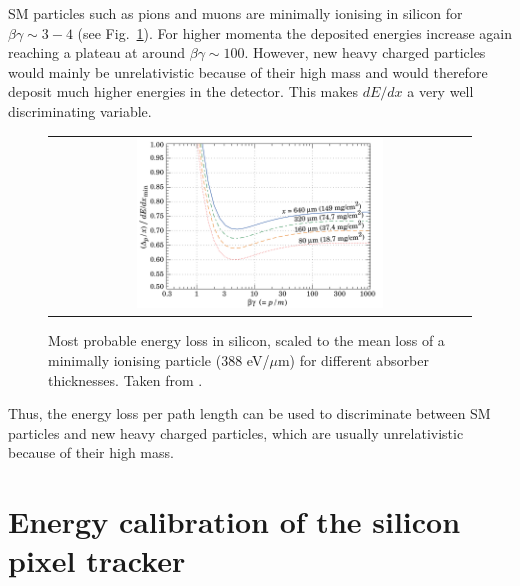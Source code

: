 SM particles such as pions and muons are minimally ionising in silicon for $\beta\gamma \sim 3-4$ (see Fig.~\ref{fig:dEdx_Landau_Silicon}). 
For higher momenta the deposited energies increase again reaching a plateau at around $\beta\gamma\sim100$. 
However, new heavy charged particles would mainly be unrelativistic because of their high mass and would therefore deposit much higher energies in the detector.
This makes $dE/dx$  a very well discriminating variable.
\begin{figure}[!bt]
  \centering 
  \begin{tabular}{c}
  \includegraphics[width=0.6\textwidth]{figures/analysis/dEdx_Landau_Silicon.png}
  \end{tabular}
  \caption{Most probable energy loss in silicon, scaled to the mean loss of a minimally ionising particle (388 eV/$\mu$m) for different absorber thicknesses. Taken from \cite{bib:PDG_2014}.} 
  \label{fig:dEdx_Landau_Silicon}
\end{figure}
Thus, the energy loss per path length can be used to discriminate between SM particles and new heavy charged particles, which are usually unrelativistic because of their high mass.

\section{Energy calibration of the silicon pixel tracker}

